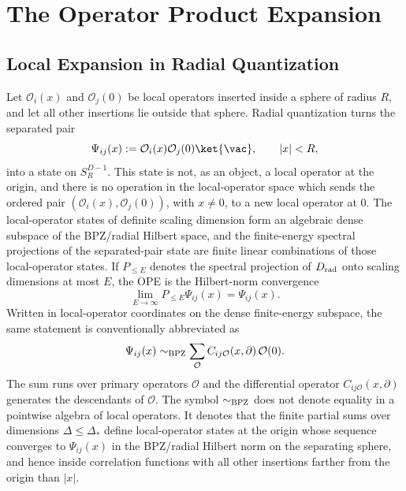\chapter{The Operator Product Expansion}
\label{ch:volume-iii-operator-product-expansion}
\ConventionsEuclideanCFT


\section{Local Expansion in Radial Quantization}

Let \(\mathcal O_i(x)\) and \(\mathcal O_j(0)\) be local operators inserted
inside a sphere of radius \(R\), and let all other insertions lie outside that
sphere.  Radial quantization turns the separated pair
\[
  \Psi_{ij}(x):=\mathcal O_i(x)\mathcal O_j(0)\ket{\vac},
  \qquad |x|<R,
\]
into a state on \(S_R^{D-1}\).  This state is not, as an object, a local
operator at the origin, and there is no operation in the local-operator
space which sends the ordered pair
\((\mathcal O_i(x),\mathcal O_j(0))\), with \(x\ne0\), to a new local
operator at \(0\).  The local-operator states of definite scaling dimension
form an algebraic dense subspace of the BPZ/radial Hilbert space, and the
finite-energy spectral projections of the separated-pair state are finite
linear combinations of those local-operator states.  If \(P_{\le E}\) denotes
the spectral projection of \(D_{\rm rad}\) onto scaling dimensions at most
\(E\), the OPE is the Hilbert-norm convergence
\[
  \lim_{E\to\infty}P_{\le E}\Psi_{ij}(x)=\Psi_{ij}(x).
\]
Written in local-operator coordinates on the dense finite-energy subspace,
the same statement is conventionally abbreviated as
\begin{equation}
  \Psi_{ij}(x)
  \sim_{\rm BPZ}
  \sum_{\mathcal O}
  C_{ij\mathcal O}(x,\partial)\,\mathcal O(0).
  \label{eq:ope-general-local}
\end{equation}
The sum runs over primary operators \(\mathcal O\) and the differential
operator \(C_{ij\mathcal O}(x,\partial)\) generates the descendants of
\(\mathcal O\).  The symbol \(\sim_{\rm BPZ}\) does not denote equality in a
pointwise algebra of local operators.  It denotes that the finite partial
sums over dimensions \(\Delta\le\Delta_*\) define local-operator states at the
origin whose sequence converges to \(\Psi_{ij}(x)\) in the BPZ/radial Hilbert
norm on the separating sphere, and hence inside correlation functions with
all other insertions farther from the origin than \(|x|\).


